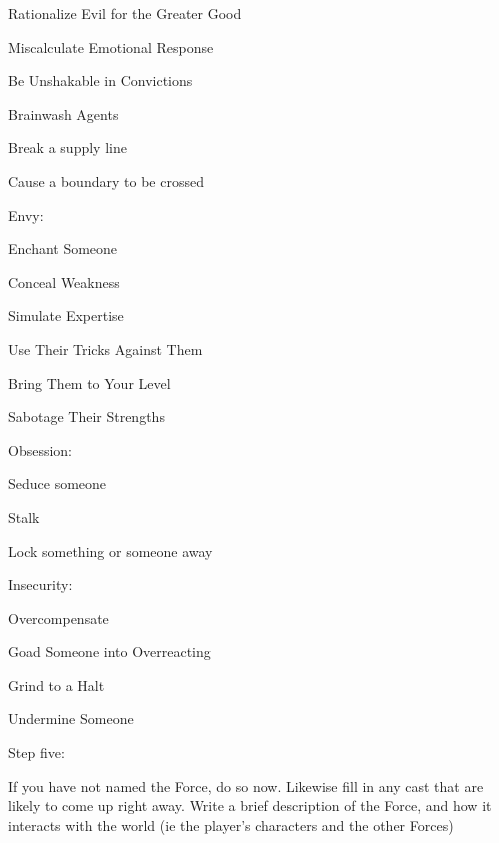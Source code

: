 \documentclass[
  oneside,
  statementpaper,
  9pt]{memoir}
\begin{document}
\begin{itemize*}

\item Rationalize Evil for the Greater Good 
\item Miscalculate Emotional Response 
\item Be Unshakable in Convictions 
\item Brainwash Agents 
\item Break a supply line 
\item Cause a boundary to be crossed 

\end{itemize*}

Envy:

\begin{itemize*}

\item Enchant Someone 
\item Conceal Weakness 
\item Simulate Expertise 
\item Use Their Tricks Against Them 
\item Bring Them to Your Level 
\item Sabotage Their Strengths

\end{itemize*}

Obsession:

\begin{itemize*}

\item Seduce someone 
\item Stalk 
\item Lock something or someone away

\end{itemize*}

Insecurity:

\begin{itemize*}

\item Overcompensate 
\item Goad Someone into Overreacting 
\item Grind to a Halt 
\item Undermine Someone

\end{itemize*}

Step five:

If you have not named the Force, do so now. Likewise fill in any cast
that are likely to come up right away. Write a brief description of the
Force, and how it interacts with the world (ie the player's characters
and the other Forces)
\end{document}
